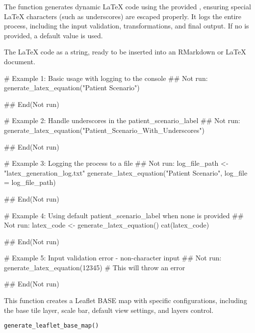 \documentclass[a4paper]{book}
\begin{document}
%
\begin{Details}
The function generates dynamic LaTeX code using the provided , ensuring
special LaTeX characters (such as underscores) are escaped properly. It logs the entire process,
including the input validation, transformations, and final output. If no 
is provided, a default value is used.
\end{Details}
%
\begin{Value}
The LaTeX code as a string, ready to be inserted into an RMarkdown or LaTeX document.
\end{Value}
%
\begin{Examples}
\begin{ExampleCode}
# Example 1: Basic usage with logging to the console
## Not run: 
generate_latex_equation("Patient Scenario")

## End(Not run)

# Example 2: Handle underscores in the patient_scenario_label
## Not run: 
generate_latex_equation("Patient_Scenario_With_Underscores")

## End(Not run)

# Example 3: Logging the process to a file
## Not run: 
log_file_path <- "latex_generation_log.txt"
generate_latex_equation("Patient Scenario", log_file = log_file_path)

## End(Not run)

# Example 4: Using default patient_scenario_label when none is provided
## Not run: 
latex_code <- generate_latex_equation()
cat(latex_code)

## End(Not run)

# Example 5: Input validation error - non-character input
## Not run: 
generate_latex_equation(12345)  # This will throw an error

## End(Not run)

\end{ExampleCode}
\end{Examples}
%
\begin{Description}
This function creates a Leaflet BASE map with specific configurations, including the base tile layer, scale bar,
default view settings, and layers control.
\end{Description}
%
\begin{Usage}
\begin{verbatim}
generate_leaflet_base_map()
\end{verbatim}
\end{Usage}
\end{document}
